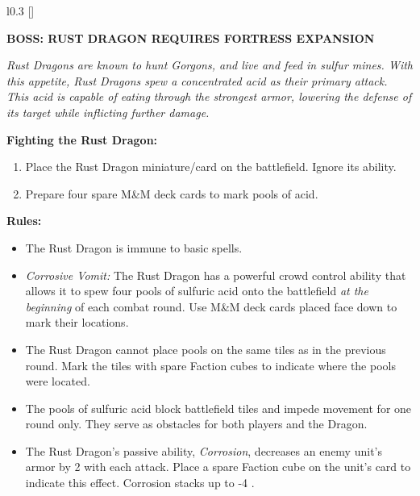 \begin{wrapfigure}{l}{0.3\textwidth}
  \raisebox{0pt}[\dimexpr{}\baselineskip\relax]{}
\end{wrapfigure}
{
  \textbf{\MakeUppercase{Boss: Rust Dragon {\scriptsize Requires Fortress Expansion}}}

  \medskip

  \textit{Rust Dragons are known to hunt Gorgons, and live and feed in sulfur mines.
    With this appetite, Rust Dragons spew a concentrated acid as their primary attack.
    This acid is capable of eating through the strongest armor, lowering the defense of its target while inflicting further damage.
  }

  \medskip

  \textbf{Fighting the Rust Dragon:}
  \begin{enumerate}
    \item Place the Rust Dragon miniature/card on the battlefield.
      Ignore its ability.
    \item Prepare four spare M\&M deck cards to mark pools of acid.
  \end{enumerate}

  \medskip

  \textbf{Rules:}
  \begin{itemize}
    \item The Rust Dragon is immune to basic spells.
    \item \textit{Corrosive Vomit:} The Rust Dragon has a powerful crowd control ability that allows it to spew four pools of sulfuric acid onto the battlefield \textit{at the beginning} of each combat round.
      Use M\&M deck cards placed face down to mark their locations.
    \item The Rust Dragon cannot place pools on the same tiles as in the previous round.
      Mark the tiles with spare Faction cubes to indicate where the pools were located.
    \item The pools of sulfuric acid block battlefield tiles and impede movement for one round only.
      They serve as obstacles for both players and the Dragon.
    \item The Rust Dragon's passive ability, \textit{Corrosion}, decreases an enemy unit's armor by 2 with each attack.
      Place a spare Faction cube on the unit's card to indicate this effect.
      Corrosion stacks up to -4 .
  \end{itemize}
}

